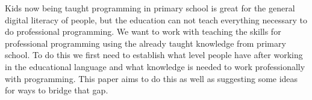 Kids now being taught programming in primary school is great for the general digital literacy of people, but the education can not teach everything necessary to do professional programming.
We want to work with teaching the skills for professional programming using the already taught knowledge from primary school.
To do this we first need to establish what level people have after working in the educational language and what knowledge is needed to work professionally with programming.
This paper aims to do this as well as suggesting some ideas for ways to bridge that gap.





